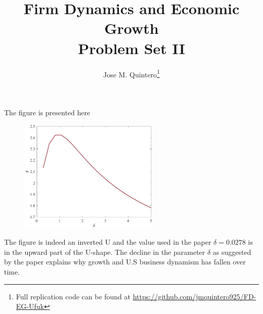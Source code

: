 \documentclass[12pt]{article}
\title{Firm Dynamics and Economic Growth \\ \large{Problem Set II}}
\author{Jose M. Quintero\thanks{Full replication code can be found at \url{https://github.com/jmquintero925/FD-EG-Ufuk}}}
\begin{document}
\maketitle

The figure is presented here
\begin{figure}[htb]
\centering
\includegraphics[width=0.6\textwidth]{Figures/figure8.pdf}
\end{figure}
The figure is indeed an inverted U and the value used in the paper $\delta=0.0278$ is in the upward part of the U-shape. The decline in the parameter $\delta$ as suggested by the paper explains why growth and U.S business dynamism has fallen over time. 
\end{document}
